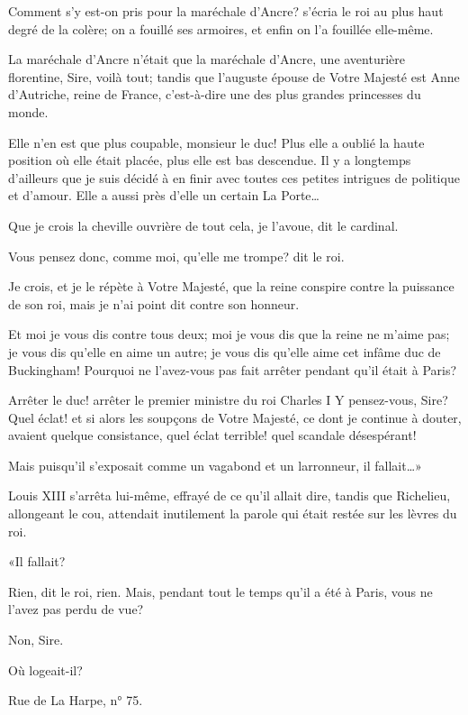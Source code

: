 \speak  Comment s'y est-on pris pour la maréchale d'Ancre? s'écria le roi au plus haut degré de la colère; on a fouillé ses armoires, et enfin on l'a fouillée elle-même. 

\speak  La maréchale d'Ancre n'était que la maréchale d'Ancre, une aventurière florentine, Sire, voilà tout; tandis que l'auguste épouse de Votre Majesté est Anne d'Autriche, reine de France, c'est-à-dire une des plus grandes princesses du monde. 

\speak  Elle n'en est que plus coupable, monsieur le duc! Plus elle a oublié la haute position où elle était placée, plus elle est bas descendue. Il y a longtemps d'ailleurs que je suis décidé à en finir avec toutes ces petites intrigues de politique et d'amour. Elle a aussi près d'elle un certain La Porte\dots 

\speak  Que je crois la cheville ouvrière de tout cela, je l'avoue, dit le cardinal. 

\speak  Vous pensez donc, comme moi, qu'elle me trompe? dit le roi. 

\speak  Je crois, et je le répète à Votre Majesté, que la reine conspire contre la puissance de son roi, mais je n'ai point dit contre son honneur. 

\speak  Et moi je vous dis contre tous deux; moi je vous dis que la reine ne m'aime pas; je vous dis qu'elle en aime un autre; je vous dis qu'elle aime cet infâme duc de Buckingham! Pourquoi ne l'avez-vous pas fait arrêter pendant qu'il était à Paris? 

\speak  Arrêter le duc! arrêter le premier ministre du roi Charles I\ier\! Y pensez-vous, Sire? Quel éclat! et si alors les soupçons de Votre Majesté, ce dont je continue à douter, avaient quelque consistance, quel éclat terrible! quel scandale désespérant! 

\speak  Mais puisqu'il s'exposait comme un vagabond et un larronneur, il fallait\dots» 

Louis XIII s'arrêta lui-même, effrayé de ce qu'il allait dire, tandis que Richelieu, allongeant le cou, attendait inutilement la parole qui était restée sur les lèvres du roi. 

«Il fallait? 

\speak  Rien, dit le roi, rien. Mais, pendant tout le temps qu'il a été à Paris, vous ne l'avez pas perdu de vue? 

\speak  Non, Sire. 

\speak  Où logeait-il? 

\speak  Rue de La Harpe, n° 75. 

